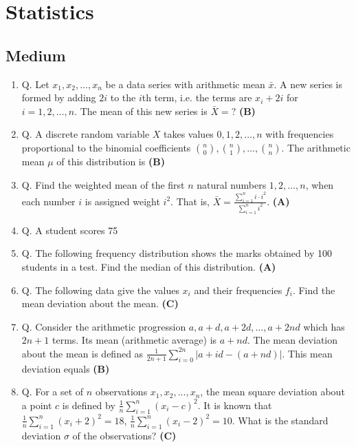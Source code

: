 \documentclass{article}
\begin{document}
\section{Statistics}
\subsection{Medium}
\begin{enumerate}
\item Q. Let $x_1,x_2,...,x_n$ be a data series with arithmetic mean $\bar{x}$. A new series is formed by adding $2i$ to the $i$th term, i.e. the terms are $x_i + 2i$ for $i = 1, 2, \dots, n$. The mean of this new series is $\bar{X}=?$ \hfill \textbf{(B)}
\item Q. A discrete random variable $X$ takes values $0, 1, 2, \dots, n$ with frequencies proportional to the binomial coefficients $\binom{n}{0}, \binom{n}{1}, \dots, \binom{n}{n}$. The arithmetic mean $\mu$ of this distribution is \hfill \textbf{(B)}
\item Q. Find the weighted mean of the first $n$ natural numbers $1, 2, \dots, n$, when each number $i$ is assigned weight $i^2$. That is, $\bar{X} = \frac{\sum_{i=1}^n i \cdot i^2}{\sum_{i=1}^n i^2}$. \hfill \textbf{(A)}
\item Q. A student scores 75%
\item Q. The following frequency distribution shows the marks obtained by 100 students in a test. Find the median of this distribution. \hfill \textbf{(A)}
\item Q. The following data give the values $x_i$ and their frequencies $f_i$. Find the mean deviation about the mean. \hfill \textbf{(C)}
\item Q. Consider the arithmetic progression $a, a + d, a + 2d, \dots, a + 2nd$ which has $2n + 1$ terms. Its mean (arithmetic average) is $a + nd$. The mean deviation about the mean is defined as $\frac{1}{2n+1}\sum_{i=0}^{2n}|a+id - (a+nd)|$. This mean deviation equals \hfill \textbf{(B)}
\item Q. For a set of $n$ observations $x_1,x_2,...,x_n$, the mean square deviation about a point $c$ is defined by $\frac{1}{n}\sum_{i=1}^n(x_i - c)^2$. It is known that $\frac{1}{n}\sum_{i=1}^n(x_i + 2)^2 = 18$, $\frac{1}{n}\sum_{i=1}^n(x_i - 2)^2 = 10$. What is the standard deviation $\sigma$ of the observations? \hfill \textbf{(C)}

\end{enumerate}
\end{document}
